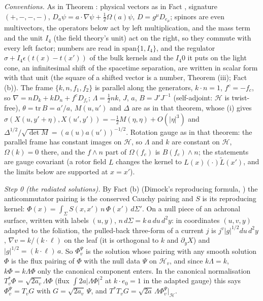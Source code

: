 \emph{Conventions.} As in Theorem : physical vectors as in Fact , signature $(+,-,-,-)$, $D_{a}\psi = a\cdot\nabla\psi + \tfrac12\Omega(a)\psi$, $D = g^{\mu}D_{e_{\mu}}$; spinors are even multivectors, the operators below act by left multiplication, and the mass term and the unit $I_{4}$ (the field theory's unit) act on the right, so they commute with every left factor; numbers are read in $\mathrm{span}\{1, I_{4}\}$, and the regulator $\sigma + I_{4}\epsilon(t(x) - t(x'))$ of the bulk kernels and the $I_{4}0$ it puts on the light cone, an infinitesimal shift of the spacetime separation, are written in scalar form with that unit (the square of a shifted vector is a number, Theorem (iii); Fact (b)). The frame $\{k, n, f_{1}, f_{2}\}$ is parallel along the generators, $k\cdot n = 1$, $f^{c} = -f_{c}$, so $\nabla = nD_{k} + kD_{n} + f^{c}D_{f_{c}}$; $\Lambda = \tfrac12 nk$, $J$, $a$, $B = J'J^{-1}$ (self-adjoint: $\mathcal{H}$ is twist-free), $\theta = \mathrm{tr}\,B = a'/a$, $M(u, u')$ and $\Delta$ are as in that theorem, whose (i) gives $\sigma(X(u, y' + \eta), X(u', y')) = -\tfrac12 M(\eta, \eta) + O(|\eta|^{3})$ and $\Delta^{1/2}/\sqrt{\det M} = (a(u)a(u'))^{-1/2}$. Rotation gauge as in that theorem: the parallel frame has constant images on $\mathcal{H}$, so $\Lambda$ and $k$ are constant on $\mathcal{H}$, $\Omega(k) = 0$ there, and the $f\wedge n$ part of $\Omega(f_{c})$ is $B(f_{c})\wedge n$; the statements are gauge covariant (a rotor field $L$ changes the kernel to $L(x)(\cdot)\tilde L(x')$, and the limits below are supported at $x = x'$).

\emph{Step 0 (the radiated solutions).} By Fact (b) (Dimock's reproducing formula, \cite{Dimock1982}) the anticommutator pairing is the conserved Cauchy pairing and $S$ is its reproducing kernel: $\Phi(x) = \int_{\Sigma}S(x, x')\,n\,\Phi(x')\,d\Sigma'$. On a null piece of an achronal surface, written with labels $(u, y)$, $n\,d\Sigma = k\,a\,du\,d^{2}y$: in coordinates $(u, v, y)$ adapted to the foliation, the pulled-back three-form of a current $j$ is $j^{v}|g|^{1/2}du\,d^{2}y$, $\nabla v = k/(k\cdot\ell)$ on the leaf (it is orthogonal to $k$ and $\partial_{y}X$) and $|g|^{1/2} = (k\cdot\ell)\,a$. So $\Phi^{\Psi}_{v}$ is the solution whose pairing with any smooth solution $\Phi$ is the flux pairing of $\Phi$ with the null data $\Psi$ on $\mathcal{H}_{v}$, and since $k\Lambda = k$, $k\Phi = k\Lambda\Phi$ only the canonical component enters. In the canonical normalisation $T_{v}^{*}\Phi = \sqrt{2a_{v}}\Lambda\Phi$ (flux $\int 2a|\Lambda\Phi|^{2}$ at $k\cdot e_{0} = 1$ in the adapted gauge) this says $\Phi^{\Psi}_{v} = T_{v}G$ with $G = \sqrt{2a_{v}}\,\Psi$, and $T^{*}T_{v}G = \sqrt{2a}\,\Lambda\Phi^{\Psi}_{v}|_{\mathcal{H}}$.

